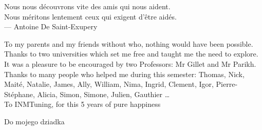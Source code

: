 \cleardoublepage
\thispagestyle{empty}


\vspace*{3cm}

\begin{raggedleft}
	Nous nous d\'ecouvrons vite des amis qui nous aident. \\
	Nous m\'eritons lentement ceux qui exigent d'\^etre aid\'es. \\
    	
     --- Antoine De Saint-Exupery\\
\end{raggedleft}

\vspace{4cm}

\begin{center}
    To my parents and my friends without who, nothing would have been possible. \\
    Thanks to two universities which set me free and taught me the need to explore. \\
    It was a pleasure to be encouraged by two Professors: Mr Gillet and Mr Parikh. \\
    Thanks to many people who helped me during this semester: Thomas, Nick, Mait\'e, Natalie, James, Ally, William, Nima, Ingrid, Clement, Igor, Pierre-St\'ephane, Alicia, Simon, Simone, Julien, Gauthier \dots \\
    To INMTuning, for this 5 years of pure happiness
\end{center}












\vspace{8cm}


\begin{raggedleft}
	Do mojego dziadka \\
\end{raggedleft}



